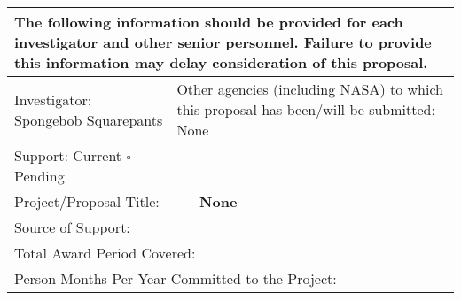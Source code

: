 \documentclass[12pt]{article}
\begin{document}
\renewcommand{\arraystretch}{1.2}
\footnotesize
\begin{tabularx}{0.5\textwidth}{|p{5cm}p{4cm}p{4cm}X|} \hline

\multicolumn{4}{|p{\dimexpr\textwidth-2\tabcolsep-0.8pt}|}{The following information should be provided for each investigator and other senior personnel. Failure to provide this information may delay consideration of this proposal.} \\

\hline

\multicolumn{2}{|l|}{Investigator: Spongebob Squarepants} & \multicolumn{2}{p{\dimexpr\textwidth-6\tabcolsep-1.2pt-9cm}|}{Other agencies (including NASA) to which this proposal has been/will be submitted: None} \\

\hline

Support: \rlap{$\square$}\raisebox{2pt}{\large\hspace{1pt}\ding{51}} Current $\square$ Pending & {} & {} & {} \\ 

\multicolumn{4}{|p{\dimexpr\textwidth-2\tabcolsep-0.8pt}|}{Project/Proposal Title: \ \ \ \ \ \textbf{None}}\\

\multicolumn{4}{|p{\dimexpr\textwidth-2\tabcolsep-0.8pt}|}{Source of Support:}\\

\multicolumn{4}{|p{\dimexpr\textwidth-2\tabcolsep-0.8pt}|}{Total Award Period Covered:}\\

\multicolumn{4}{|p{\dimexpr\textwidth-2\tabcolsep-0.8pt}|}{Person-Months Per Year Committed to the Project:}\\

\hline


\end{tabularx}
\end{document}
